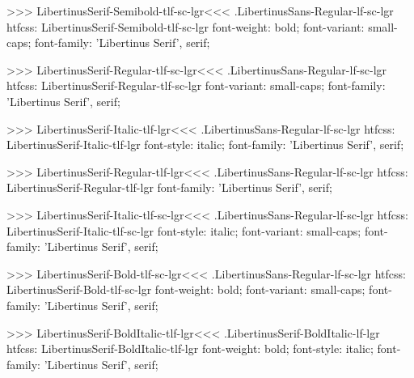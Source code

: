>>>
\<LibertinusSerif-Semibold-tlf-sc-lgr\><<<
.LibertinusSans-Regular-lf-sc-lgr
htfcss:  LibertinusSerif-Semibold-tlf-sc-lgr  font-weight: bold; font-variant: small-caps; font-family: 'Libertinus Serif', serif;

>>>
\<LibertinusSerif-Regular-tlf-sc-lgr\><<<
.LibertinusSans-Regular-lf-sc-lgr
htfcss:  LibertinusSerif-Regular-tlf-sc-lgr  font-variant: small-caps; font-family: 'Libertinus Serif', serif;

>>>
\<LibertinusSerif-Italic-tlf-lgr\><<<
.LibertinusSans-Regular-lf-sc-lgr
htfcss:  LibertinusSerif-Italic-tlf-lgr  font-style: italic; font-family: 'Libertinus Serif', serif;

>>>
\<LibertinusSerif-Regular-tlf-lgr\><<<
.LibertinusSans-Regular-lf-sc-lgr
htfcss:  LibertinusSerif-Regular-tlf-lgr  font-family: 'Libertinus Serif', serif;

>>>
\<LibertinusSerif-Italic-tlf-sc-lgr\><<<
.LibertinusSans-Regular-lf-sc-lgr
htfcss:  LibertinusSerif-Italic-tlf-sc-lgr  font-style: italic; font-variant: small-caps; font-family: 'Libertinus Serif', serif;

>>>
\<LibertinusSerif-Bold-tlf-sc-lgr\><<<
.LibertinusSans-Regular-lf-sc-lgr
htfcss:  LibertinusSerif-Bold-tlf-sc-lgr  font-weight: bold; font-variant: small-caps; font-family: 'Libertinus Serif', serif;

>>>
\<LibertinusSerif-BoldItalic-tlf-lgr\><<<
.LibertinusSerif-BoldItalic-lf-lgr
htfcss:  LibertinusSerif-BoldItalic-tlf-lgr  font-weight: bold; font-style: italic; font-family: 'Libertinus Serif', serif;

